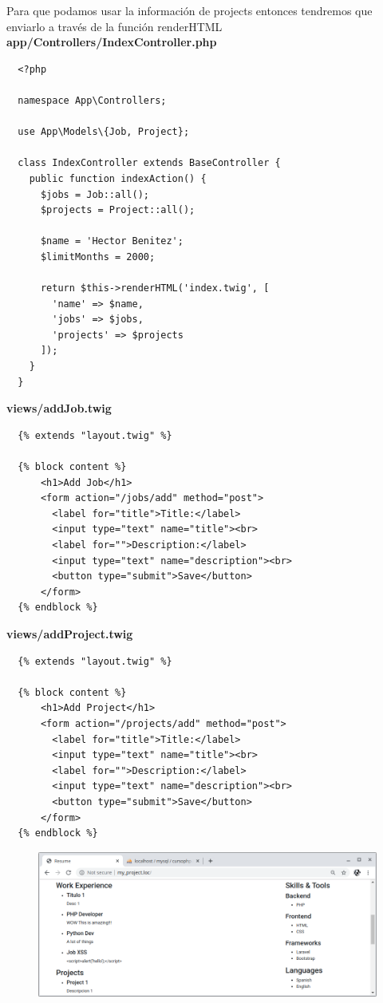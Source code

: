 \documentclass{article}
\begin{document}
Para que podamos usar la información de projects entonces tendremos que
enviarlo a través de la función renderHTML\\

\textbf{app/Controllers/IndexController.php}
\begin{verbatim}
  <?php

  namespace App\Controllers;

  use App\Models\{Job, Project};

  class IndexController extends BaseController {
    public function indexAction() {
      $jobs = Job::all();
      $projects = Project::all();

      $name = 'Hector Benitez';
      $limitMonths = 2000;

      return $this->renderHTML('index.twig', [
        'name' => $name,
        'jobs' => $jobs,
        'projects' => $projects
      ]);
    }
  }
\end{verbatim}


\textbf{views/addJob.twig}
\begin{verbatim}
  {% extends "layout.twig" %}

  {% block content %}
      <h1>Add Job</h1>
      <form action="/jobs/add" method="post">
        <label for="title">Title:</label>
        <input type="text" name="title"><br>
        <label for="">Description:</label>
        <input type="text" name="description"><br>
        <button type="submit">Save</button>
      </form>
  {% endblock %}
\end{verbatim}

\textbf{views/addProject.twig}
\begin{verbatim}
  {% extends "layout.twig" %}

  {% block content %}
      <h1>Add Project</h1>
      <form action="/projects/add" method="post">
        <label for="title">Title:</label>
        <input type="text" name="title"><br>
        <label for="">Description:</label>
        <input type="text" name="description"><br>
        <button type="submit">Save</button>
      </form>
  {% endblock %}
\end{verbatim}

\begin{figure}[h!]
  \centering
  \includegraphics[scale=0.5]{./Pictures/159_twig_index.png}
\end{figure}
\end{document}
